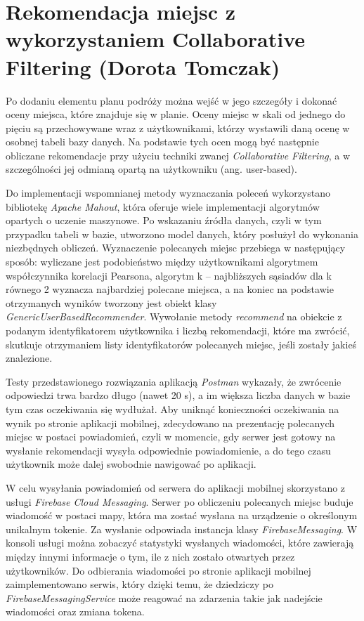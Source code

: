 \documentclass[10pt,twoside,a4paper]{report}
\begin{document}
\section{Rekomendacja miejsc z wykorzystaniem Collaborative Filtering (Dorota Tomczak)}
\par Po dodaniu elementu planu podróży można wejść w jego szczegóły i dokonać oceny miejsca, które znajduje się w planie. Oceny miejsc w skali od jednego do pięciu są przechowywane wraz z użytkownikami, którzy wystawili daną ocenę w osobnej tabeli bazy danych. Na podstawie tych ocen mogą być następnie obliczane rekomendacje przy użyciu techniki zwanej \textit{Collaborative Filtering}, a w szczególności jej odmianą opartą na użytkowniku (ang. user-based).
\par Do implementacji wspomnianej metody wyznaczania poleceń wykorzystano bibliotekę \textit{Apache Mahout}\cite{Apache Mahout}, która oferuje wiele implementacji algorytmów opartych o uczenie maszynowe. Po wskazaniu źródła danych, czyli w tym przypadku tabeli w bazie, utworzono model danych, który posłużył do wykonania niezbędnych obliczeń. Wyznaczenie polecanych miejsc przebiega w następujący sposób: wyliczane jest podobieństwo między użytkownikami algorytmem współczynnika korelacji Pearsona, algorytm k – najbliższych sąsiadów dla k równego 2 wyznacza najbardziej polecane miejsca, a na koniec na podstawie otrzymanych wyników tworzony jest obiekt klasy \textit{GenericUserBasedRecommender}. Wywołanie metody \textit{recommend} na obiekcie z podanym identyfikatorem użytkownika i liczbą rekomendacji, które ma zwrócić, skutkuje otrzymaniem listy identyfikatorów polecanych miejsc, jeśli zostały jakieś znalezione.
\par Testy przedstawionego rozwiązania aplikacją \textit{Postman}\cite{Postman} wykazały, że zwrócenie odpowiedzi trwa bardzo długo (nawet 20 s), a im większa liczba danych w bazie tym czas oczekiwania się wydłużał. Aby uniknąć konieczności oczekiwania na wynik po stronie aplikacji mobilnej, zdecydowano na prezentację polecanych miejsc w postaci powiadomień, czyli w momencie, gdy serwer jest gotowy na wysłanie rekomendacji wysyła odpowiednie powiadomienie, a do tego czasu użytkownik może dalej swobodnie nawigować po aplikacji.
\par W celu wysyłania powiadomień od serwera do aplikacji mobilnej skorzystano z usługi \textit{Firebase Cloud Messaging}\cite{Firebase}. Serwer po obliczeniu polecanych miejsc buduje wiadomość w postaci mapy, która ma zostać wysłana na urządzenie o określonym unikalnym tokenie. Za wysłanie odpowiada instancja klasy \textit{FirebaseMessaging}. W konsoli usługi można zobaczyć statystyki wysłanych wiadomości, które zawierają między innymi informacje o tym, ile z nich zostało otwartych przez użytkowników. Do odbierania wiadomości po stronie aplikacji mobilnej zaimplementowano serwis, który dzięki temu, że dziedziczy po \textit{FirebaseMessagingService} może reagować na zdarzenia takie jak nadejście wiadomości oraz zmiana tokena.
\end{document}
